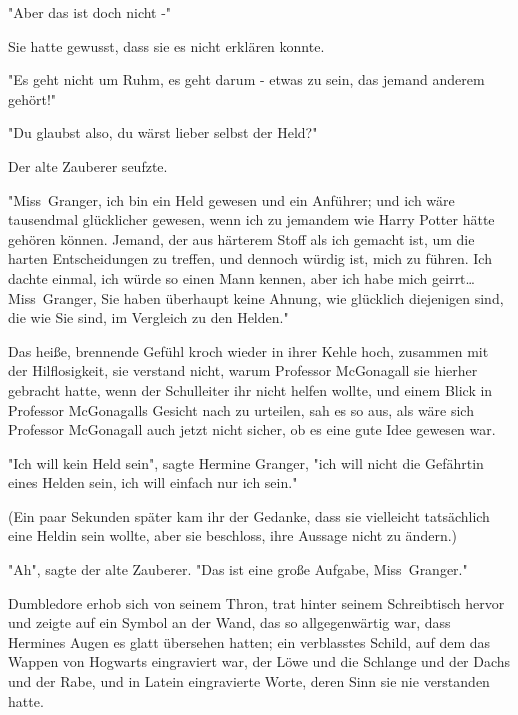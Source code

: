 {"Aber das ist doch nicht -"

Sie hatte gewusst, dass sie es nicht erklären konnte.

"Es geht nicht um Ruhm, es geht darum - etwas zu sein, das jemand anderem gehört!"

"Du glaubst also, du wärst lieber selbst der Held?"

Der alte Zauberer seufzte.

"Miss~Granger, ich bin ein Held gewesen und ein Anführer; und ich wäre tausendmal glücklicher gewesen, wenn ich zu jemandem wie Harry Potter hätte gehören können. Jemand, der aus härterem Stoff als ich gemacht ist, um die harten Entscheidungen zu treffen, und dennoch würdig ist, mich zu führen. Ich dachte einmal, ich würde so einen Mann kennen, aber ich habe mich geirrt… Miss~Granger, Sie haben überhaupt keine Ahnung, wie glücklich diejenigen sind, die wie Sie sind, im Vergleich zu den Helden."

Das heiße, brennende Gefühl kroch wieder in ihrer Kehle hoch, zusammen mit der Hilflosigkeit, sie verstand nicht, warum Professor McGonagall sie hierher gebracht hatte, wenn der Schulleiter ihr nicht helfen wollte, und einem Blick in Professor McGonagalls Gesicht nach zu urteilen, sah es so aus, als wäre sich Professor McGonagall auch jetzt nicht sicher, ob es eine gute Idee gewesen war.

"Ich will kein Held sein", sagte Hermine Granger, "ich will nicht die Gefährtin eines Helden sein, ich will einfach nur ich sein."

(Ein paar Sekunden später kam ihr der Gedanke, dass sie vielleicht tatsächlich eine Heldin sein wollte, aber sie beschloss, ihre Aussage nicht zu ändern.)

"Ah", sagte der alte Zauberer. "Das ist eine große Aufgabe, Miss~Granger."

Dumbledore erhob sich von seinem Thron, trat hinter seinem Schreibtisch hervor und zeigte auf ein Symbol an der Wand, das so allgegenwärtig war, dass Hermines Augen es glatt übersehen hatten; ein verblasstes Schild, auf dem das Wappen von Hogwarts eingraviert war, der Löwe und die Schlange und der Dachs und der Rabe, und in Latein eingravierte Worte, deren Sinn sie nie verstanden hatte.

}
